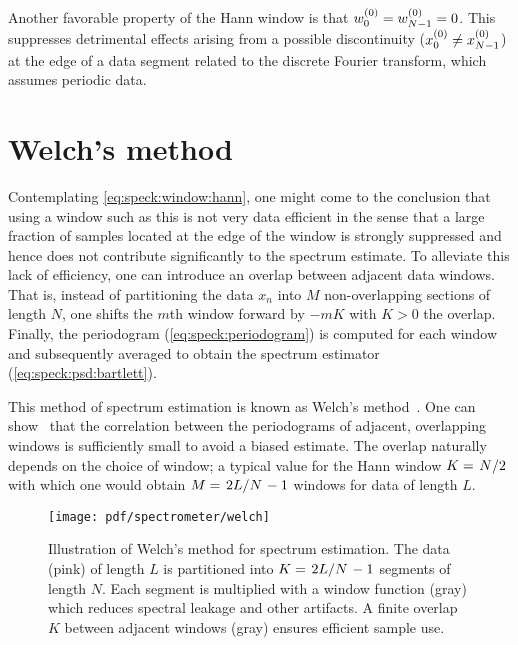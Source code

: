 Another favorable property of the Hann window is that $w_0^{(0)} = w_{N-1}^{(0)} = 0$.
This suppresses detrimental effects arising from a possible discontinuity ($x_0^{(0)}\neq x_{N-1}^{(0)}$) at the edge of a data segment related to the discrete Fourier transform, which assumes periodic data.

\section{Welch's method}\label{sec:speck:theory:welch}
Contemplating \cref{eq:speck:window:hann}, one might come to the conclusion that using a window such as this is not very data efficient in the sense that a large fraction of samples located at the edge of the window is strongly suppressed and hence does not contribute significantly to the spectrum estimate.
To alleviate this lack of efficiency, one can introduce an overlap between adjacent data windows.
That is, instead of partitioning the data $x_n$ into $M$ non-overlapping sections of length $N$, one shifts the $m$th window forward by $-mK$ with $K>0$ the overlap.
Finally, the periodogram (\cref{eq:speck:periodogram}) is computed for each window and subsequently averaged to obtain the spectrum estimator (\cref{eq:speck:psd:bartlett}).

This method of spectrum estimation is known as Welch's method~\cite{Welch1967}.
One can show~\cite{Welch1967} that the correlation between the periodograms of adjacent, overlapping windows is sufficiently small to avoid a biased estimate.
The overlap naturally depends on the choice of window; a typical value for the Hann window $K = \flatfrac{N}{2}$ with which one would obtain $M = \flatfrac{2L}{N} - 1$ windows for data of length $L$.
\begin{figure}[tphb]
    \texttt{[image: pdf/spectrometer/welch]}
    \caption{
        Illustration of Welch's method for spectrum estimation.
        The data (pink) of length $L$ is partitioned into $K = \flatfrac{2L}{N} - 1$ segments of length $N$.
        Each segment is multiplied with a window function (gray) which reduces spectral leakage and other artifacts.
        A finite overlap $K$ between adjacent windows (gray) ensures efficient sample use.
    }
    \label{fig:welch}
\end{figure}

